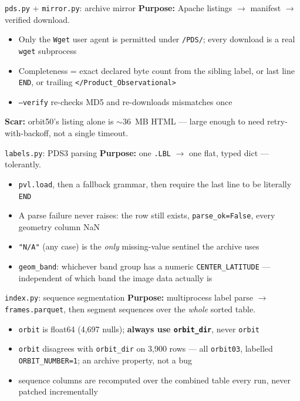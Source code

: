 \documentclass[aspectratio=169,11pt]{beamer}
\newcommand{\currevsec}{}
\newcommand{\revsec}[1]{\gdef\currevsec{#1}}
\begin{document}
\begin{frame}{\texttt{pds.py} + \texttt{mirror.py}: archive mirror}
  \revsec{4.1}
  \textbf{Purpose:} Apache listings $\to$ manifest $\to$ verified download.
  \begin{itemize}
    \item Only the \texttt{Wget} user agent is permitted under \texttt{/PDS/}; every download is a real \texttt{wget} subprocess
    \item Completeness = exact declared byte count from the sibling label, or last line \texttt{END}, or trailing \texttt{</Product\_Observational>}
    \item \texttt{--verify} re-checks MD5 and re-downloads mismatches once
  \end{itemize}
  \textbf{Scar:} orbit50's listing alone is $\sim$36~MB HTML --- large enough to need retry-with-backoff, not a single timeout.
\end{frame}

\begin{frame}{\texttt{labels.py}: PDS3 parsing}
  \revsec{4.2}
  \textbf{Purpose:} one \texttt{.LBL} $\to$ one flat, typed dict --- tolerantly.
  \begin{itemize}
    \item \texttt{pvl.load}, then a fallback grammar, then require the last line to be literally \texttt{END}
    \item A parse failure never raises: the row still exists, \texttt{parse\_ok=False}, every geometry column NaN
    \item \texttt{"N/A"} (any case) is the \emph{only} missing-value sentinel the archive uses
    \item \texttt{geom\_band}: whichever band group has a numeric \texttt{CENTER\_LATITUDE} --- independent of which band the image data actually is
  \end{itemize}
\end{frame}

\begin{frame}{\texttt{index.py}: sequence segmentation}
  \revsec{4.3}
  \textbf{Purpose:} multiprocess label parse $\to$ \texttt{frames.parquet}, then segment sequences over the \emph{whole} sorted table.
  \begin{itemize}
    \item \texttt{orbit} is float64 (4{,}697 nulls); \textbf{always use \texttt{orbit\_dir}}, never \texttt{orbit}
    \item \texttt{orbit} disagrees with \texttt{orbit\_dir} on 3{,}900 rows --- all \texttt{orbit03}, labelled \texttt{ORBIT\_NUMBER=1}; an archive property, not a bug
    \item sequence columns are recomputed over the combined table every run, never patched incrementally
  \end{itemize}
\end{frame}
\end{document}
